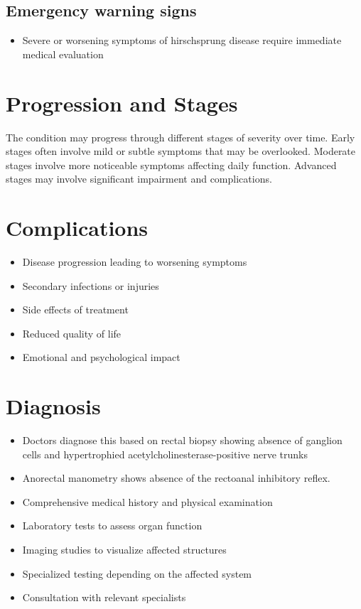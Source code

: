 \subsection{Emergency warning signs}
\begin{itemize}[noitemsep]
  \item Severe or worsening symptoms of hirschsprung disease require immediate medical evaluation
\end{itemize}
\section{Progression and Stages}
The condition may progress through different stages of severity over time. Early stages often involve mild or subtle symptoms that may be overlooked. Moderate stages involve more noticeable symptoms affecting daily function. Advanced stages may involve significant impairment and complications.
\section{Complications}
\begin{itemize}[noitemsep]
  \item Disease progression leading to worsening symptoms
  \item Secondary infections or injuries
  \item Side effects of treatment
  \item Reduced quality of life
  \item Emotional and psychological impact
\end{itemize}
\section{Diagnosis}
\begin{itemize}[noitemsep]
  \item Doctors diagnose this based on rectal biopsy showing absence of ganglion cells and hypertrophied acetylcholinesterase-positive nerve trunks
  \item Anorectal manometry shows absence of the rectoanal inhibitory reflex.
  \item Comprehensive medical history and physical examination
  \item Laboratory tests to assess organ function
  \item Imaging studies to visualize affected structures
  \item Specialized testing depending on the affected system
  \item Consultation with relevant specialists
\end{itemize}
